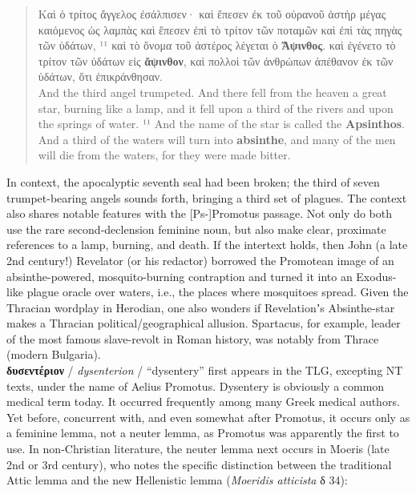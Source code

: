 \vspace*{2mm} 
 \begin{quote}
Καὶ ὁ τρίτος ἄγγελος ἐσάλπισεν· %
καὶ ἔπεσεν ἐκ τοῦ οὐρανοῦ ἀστὴρ μέγας καιόμενος ὡς λαμπὰς %
καὶ ἔπεσεν ἐπὶ τὸ τρίτον τῶν ποταμῶν καὶ ἐπὶ τὰς πηγὰς τῶν ὑδάτων, %
¹¹ καὶ τὸ ὄνομα τοῦ ἀστέρος λέγεται ὁ \textbf{Ἄψινθος}. %
 καὶ ἐγένετο τὸ τρίτον τῶν ὑδάτων εἰς \textbf{ἄψινθον}, %
 καὶ πολλοὶ τῶν ἀνθρώπων ἀπέθανον ἐκ τῶν ὑδάτων, %
 ὅτι ἐπικράνθησαν. \\[1mm] %
 And the third angel trumpeted. %
 And there fell from the heaven a great star, burning like a lamp, %
 and it fell upon a third of the rivers %
 and upon the springs of water. %
 ¹¹ And the name of the star is called the \textbf{Apsinthos}. %
 And a third of the waters will turn into \textbf{absinthe}, %
 and many of the men will die from the waters, %
 for they were made bitter. \end{quote} %
\clearpage

In context, the apocalyptic seventh seal had been broken; %
the third of seven trumpet-bearing angels sounds forth, bringing a third set of plagues. %
The context also shares notable features with the [Ps-]Promotus passage. %
Not only do both use the rare second-declension feminine noun, %
but also make clear, proximate references to a lamp, burning, and death. %
If the intertext holds, then John (a late 2nd century!) Revelator (or his redactor) %
borrowed the Promotean image of an absinthe-powered, mosquito-burning contraption %
and turned it into an Exodus-like plague oracle over waters, %
i.e., the places where mosquitoes spread. %
Given the Thracian wordplay in Herodian, %
one also wonders if Revelationʼs Absinthe-star makes a Thracian political/geographical allusion. %
Spartacus, for example, leader of the most famous slave-revolt in Roman history, %
was notably from Thrace (modern Bulgaria). \\[1.5mm] %

\noindent{}\textbf{δυσεντέριον} / \textit{dysenterion} / “dysentery” %
first appears in the TLG, excepting NT texts, %
under the name of Aelius Promotus. %
Dysentery is obviously a common medical term today. %
It occurred frequently among many Greek medical authors. %
Yet before, concurrent with, and even somewhat after Promotus, %
it occurs only as a feminine lemma, %
not a neuter lemma, as Promotus was apparently the first to use. %
In non-Christian literature, the neuter lemma %
next occurs in Moeris (late 2nd or 3rd century), %
who notes the specific distinction between the traditional Attic lemma %
and the new Hellenistic lemma (\textit{Moeridis atticista} δ 34): %


